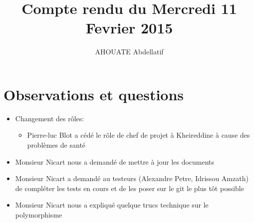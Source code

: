 \documentclass{../../../../../res/rapport}
\author{AHOUATE Abdellatif}
\title{Compte rendu du Mercredi 11 Fevrier 2015}
\begin{document}
    \maketitle
    \tableofcontents
    \clearpage
    
    \section{Observations et questions} 
    \label{sec:observations_et_questions}
	\begin{itemize}
        \item Changement des rôles: 
        	\begin{itemize}
        		\item Pierre-luc Blot a cédé le rôle de chef de projet à Kheireddine à cause des problèmes de santé
        	\end{itemize} 
		\item Monsieur Nicart nous a demandé de mettre à jour les documents
		\item Monsieur Nicart a demandé au testeurs (Alexandre Petre, Idrissou Amzath) de compléter les tests en cours et de les poser sur le git le plus tôt possible
		\item Monsieur Nicart nous a expliqué quelque trucs technique sur le polymorphisme
	\end{itemize}
\end{document}
